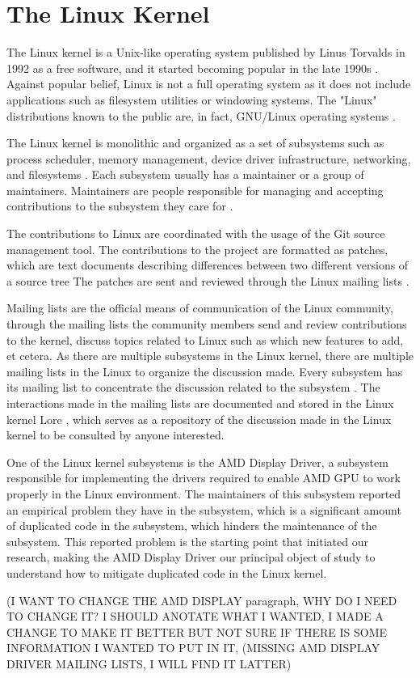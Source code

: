 \en

\section{The Linux Kernel}

The Linux kernel is a Unix-like operating system published by Linus Torvalds in 1992 as a free software, and
it started becoming popular in the late 1990s \citep{linuxbook}. Against popular belief, Linux is not a full 
operating system as it does not include applications such as filesystem utilities or windowing systems. The "Linux" 
distributions known to the public are, in fact, GNU/Linux operating systems \citep{gnuref}.

The Linux kernel is monolithic and organized as a set of subsystems such as process scheduler, memory management, 
device driver infrastructure, networking, and filesystems \citep{melissa}.
Each subsystem usually has a maintainer or a group of maintainers.  Maintainers are people responsible 
for managing and accepting contributions to the subsystem they care for \citep{melissa}.

The contributions to Linux are coordinated with the usage of the Git source management tool.
The contributions to the project are formatted as patches, which are text documents describing differences 
between two different versions of a source tree The patches are sent and reviewed through the 
Linux mailing lists \citep{melissa}.

Mailing lists are the official means of communication of the Linux community, through the mailing lists 
the community members send and review contributions to the kernel, discuss topics related to Linux such as 
which new features to add, et cetera. As there are multiple subsystems in the Linux kernel, there are 
multiple mailing lists in the Linux to organize the discussion made. Every subsystem has its mailing 
list to concentrate the discussion related to the subsystem \citep{melissa}. 
The interactions made in the mailing lists are documented and stored in the Linux kernel Lore
\citep{linuxlore}, which serves as a repository of the discussion made in the Linux kernel to be
consulted by anyone interested.

One of the Linux kernel subsystems is the AMD Display Driver, a subsystem responsible for 
implementing the drivers required to enable AMD GPU to work properly in the Linux environment. 
The maintainers of this subsystem reported an empirical problem they have in the subsystem, which is 
a significant amount of duplicated code in the subsystem, which hinders the maintenance of the subsystem.
This reported problem is the starting point that initiated our research, making the AMD Display Driver our 
principal object of study to understand how to mitigate duplicated code in the Linux kernel.


(I WANT TO CHANGE THE AMD DISPLAY paragraph, WHY DO I NEED TO CHANGE IT? I SHOULD ANOTATE WHAT I WANTED, I MADE A CHANGE
 TO MAKE IT BETTER BUT NOT SURE IF THERE IS SOME INFORMATION I WANTED TO PUT IN IT, 
(MISSING AMD DISPLAY DRIVER MAILING LISTS, I WILL FIND IT LATTER)


